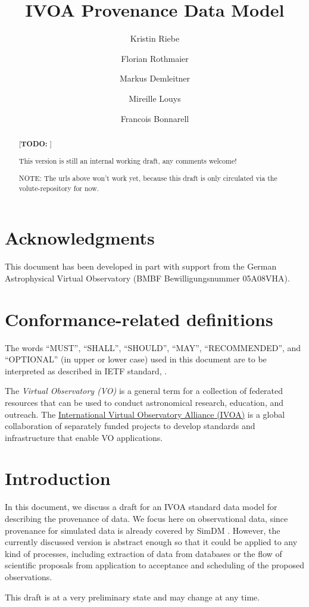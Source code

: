 \documentclass[11pt,a4paper]{ivoa}
\title{IVOA Provenance Data Model}
\author{Kristin Riebe}
\author{Florian Rothmaier}
\author{Markus Demleitner}
\author{Mireille Louys}
\author{Francois Bonnarell}
\newcommand{\TODO}[1]{\noindent \textcolor{todocolor}{[\textbf{TODO:} #1]}}
\begin{document}
\begin{abstract}
\TODO{}

This version is still an internal working draft, any comments welcome!

NOTE: The urls above won't work yet, because this draft is only circulated via the volute-repository for now.
\end{abstract}


\section*{Acknowledgments}

This document has been developed in part with support from the German
Astrophysical Virtual Observatory (BMBF Bewilligungsnummer 05A08VHA).



\section*{Conformance-related definitions}

The words ``MUST'', ``SHALL'', ``SHOULD'', ``MAY'', ``RECOMMENDED'', and
``OPTIONAL'' (in upper or lower case) used in this document are to be
interpreted as described in IETF standard, \citet{std:RFC2119}.

The \emph{Virtual Observatory (VO)} is
a general term for a collection of federated resources that can be used
to conduct astronomical research, education, and outreach.
The \href{http://www.ivoa.net}{International
Virtual Observatory Alliance (IVOA)} is a global
collaboration of separately funded projects to develop standards and
infrastructure that enable VO applications.


\section{Introduction}

In this document, we discuss a draft for an IVOA standard data model for describing the
provenance of data. We focus here on observational data, since provenance for
simulated data is already covered by SimDM 
\cite{std:SimDM}. However, the currently discussed version is abstract enough so that 
it could be applied to any kind of processes, including extraction of data from databases 
or the flow of scientific proposals from application to acceptance and scheduling of 
the proposed observations.

This draft is at a very preliminary state and may change at any time.
\end{document}
